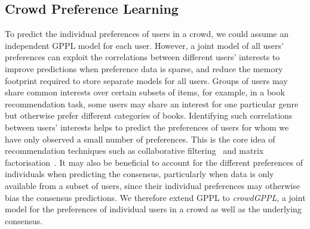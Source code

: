 \subsection{Crowd Preference Learning} \label{sec:crowd_model}


To predict the individual preferences of users in a crowd,
we could assume an independent GPPL model for each user.
However, a joint model of all users' preferences can
exploit the correlations between different users' interests
to improve predictions when preference data is sparse,
and reduce the memory footprint required to store separate models for all users.
Groups of users may share common interests over certain subsets of items,
for example, in a book recommendation task,
some users may share an interest for one particular genre 
but otherwise prefer different categories of books.
Identifying such correlations between users' interests helps to predict 
the preferences of users for whom we have only observed a small number of preferences.
This is the core idea of recommendation techniques such as collaborative filtering~\citep{resnick1997recommender} and matrix factorisation~\citep{koren2009matrix}.
It may also be beneficial to account for the different 
preferences of individuals when predicting the consensus,
particularly when data is only available from a subset of users,
since their individual preferences may otherwise bias the consensus predictions.
We therefore extend GPPL to \emph{crowdGPPL}, a joint model for 
the preferences of individual users in a crowd as well as the underlying consensus.
 
